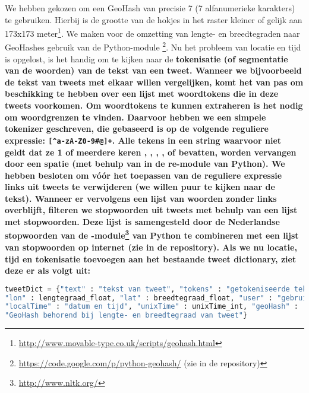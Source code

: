 {{We hebben gekozen om een GeoHash van precisie 7 (7 alfanumerieke karakters) te gebruiken. 
Hierbij is de grootte van de hokjes in het raster kleiner of gelijk aan 173x173 
meter\footnote{\url{http://www.movable-type.co.uk/scripts/geohash.html}}. We maken voor de omzetting van lengte- en breedtegraden naar GeoHashes 
gebruik van de Python-module \footnote{\url{https://code.google.com/p/python-geohash/} (zie  in de repository)}.
\vl
Nu het probleem van locatie en tijd is opgelost, is het handig om te kijken naar 
de \bf{tokenisatie} (of \bf{segmentatie} van de woorden) van de tekst van een tweet. Wanneer we bijvoorbeeld de tekst van 
tweets met elkaar willen vergelijken, komt het van pas om beschikking te hebben 
over een lijst met woordtokens die in deze tweets voorkomen. Om woordtokens te kunnen 
extraheren is het nodig om woordgrenzen te vinden. Daarvoor hebben we een simpele 
tokenizer geschreven, die gebaseerd is op de volgende reguliere expressie: 
\verb|[^a-zA-Z0-9#@]+|. Alle tekens in een string waarvoor niet geldt dat ze 1 of 
meerdere keren , , , \ttt{\#}, of  bevatten, worden vervangen door een spatie 
(met behulp van  in de {re}-module van Python). We hebben besloten om 
vóór het toepassen van de reguliere expressie links uit tweets te verwijderen 
(we willen puur te kijken naar de tekst). Wanneer er vervolgens een lijst van 
woorden zonder links overblijft, filteren we stopwoorden uit tweets met behulp 
van een lijst met stopwoorden. Deze lijst is samengesteld door de Nederlandse 
stopwoorden van de -module\footnote{\url{http://www.nltk.org/}} van Python te combineren met een lijst van 
stopwoorden op internet (zie  in de repository).
\vl
Als we nu locatie, tijd en tokenisatie toevoegen aan het bestaande tweet 
dictionary, ziet deze er als volgt uit:

\begin{lstlisting}[language=Python]
tweetDict = {"text" : "tekst van tweet", "tokens" : "getokeniseerde tekst", 
"lon" : lengtegraad_float, "lat" : breedtegraad_float, "user" : "gebruikersnaam", 
"localTime" : "datum en tijd", "unixTime" : unixTime_int, "geoHash" : 
"GeoHash behorend bij lengte- en breedtegraad van tweet"}
\end{lstlisting}
\vspace*{-10pt}

\label{ClusterCreator}

}}
